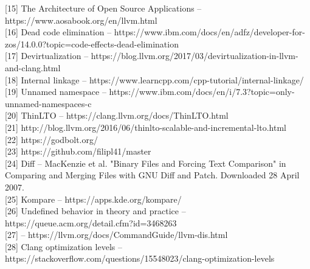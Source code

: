 \documentclass[12pt,oneside]{memoir}
\begin{document}
[15] The Architecture of Open Source Applications --https://www.aosabook.org/en/llvm.html \\

[16] Dead code elimination -- https://www.ibm.com/docs/en/adfz/developer-for-zos/14.0.0?topic=code-effects-dead-elimination \\

[17] Devirtualization -- https://blog.llvm.org/2017/03/devirtualization-in-llvm-and-clang.html \\

[18] Internal linkage -- https://www.learncpp.com/cpp-tutorial/internal-linkage/ \\

[19] Unnamed namespace -- https://www.ibm.com/docs/en/i/7.3?topic=only-unnamed-namespaces-c \\

[20] ThinLTO -- https://clang.llvm.org/docs/ThinLTO.html \\

[21] http://blog.llvm.org/2016/06/thinlto-scalable-and-incremental-lto.html \\

[22] https://godbolt.org/ \\

[23] https://github.com/filipl41/master \\

[24] Diff -- MacKenzie et al. "Binary Files and Forcing Text Comparison" in Comparing and Merging Files with GNU Diff and Patch. Downloaded 28 April 2007.\\

[25] Kompare -- https://apps.kde.org/kompare/ \\

[26] Undefined behavior in theory and practice -- https://queue.acm.org/detail.cfm?id=3468263 \\

[27] -- https://llvm.org/docs/CommandGuide/llvm-dis.html \\

[28] Clang optimization levels -- https://stackoverflow.com/questions/15548023/clang-optimization-levels
\end{document}
